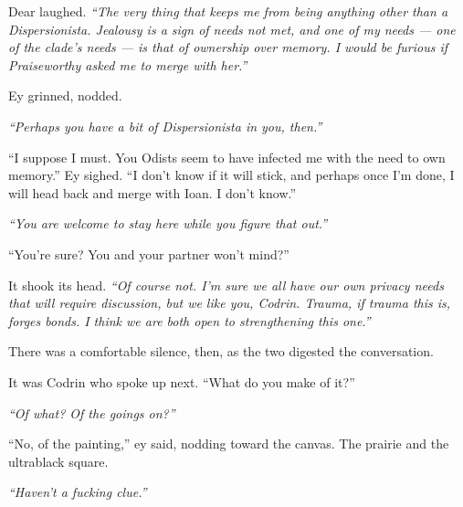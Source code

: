 Dear laughed. \emph{``The very thing that keeps me from being anything other than a Dispersionista. Jealousy is a sign of needs not met, and one of my needs — one of the clade's needs — is that of ownership over memory. I would be furious if Praiseworthy asked me to merge with her.''}

Ey grinned, nodded.

\emph{``Perhaps you have a bit of Dispersionista in you, then.''}

``I suppose I must. You Odists seem to have infected me with the need to own memory.'' Ey sighed. ``I don't know if it will stick, and perhaps once I'm done, I will head back and merge with Ioan. I don't know.''

\emph{``You are welcome to stay here while you figure that out.''}

``You're sure? You and your partner won't mind?''

It shook its head. \emph{``Of course not. I'm sure we all have our own privacy needs that will require discussion, but we like you, Codrin. Trauma, if trauma this is, forges bonds. I think we are both open to strengthening this one.''}

There was a comfortable silence, then, as the two digested the conversation.

It was Codrin who spoke up next. ``What do you make of it?''

\emph{``Of what? Of the goings on?''}

``No, of the painting,'' ey said, nodding toward the canvas. The prairie and the ultrablack square.

\emph{``Haven't a fucking clue.''}
